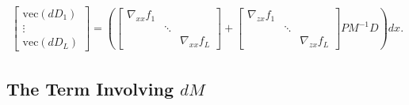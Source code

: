 \documentclass{article}
\begin{document}
\begin{align}
    \begin{bmatrix}
        \mathrm{vec}\left(dD_1\right) \\
        \vdots                        \\
        \mathrm{vec}\left(dD_L\right)
    \end{bmatrix}
    =
    \left(
    \begin{bmatrix}
        \nabla_{xx} f_1 &        &                 \\
                        & \ddots &                 \\
                        &        & \nabla_{xx} f_L
    \end{bmatrix}
    +
    \begin{bmatrix}
        \nabla_{zx} f_1 \\ &\ddots& \\ &&\nabla_{zx} f_L
    \end{bmatrix}
    P M^{-1} D
    \right)dx.
\end{align}

\subsection{The Term Involving $dM$}
\end{document}
